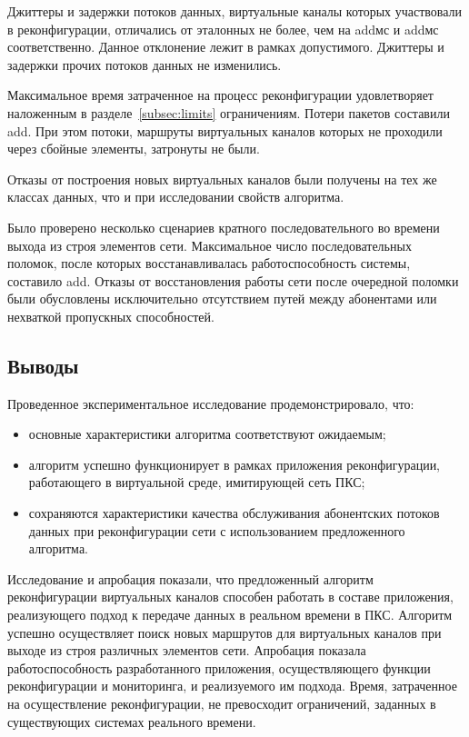 \documentclass[12pt, a4paper]{article}
\begin{document}
Джиттеры и задержки потоков данных, виртуальные каналы которых участвовали в реконфигурации, отличались от эталонных не более, чем на addмс и addмс соответственно. Данное отклонение лежит в рамках допустимого. Джиттеры и задержки прочих потоков данных не изменились.

Максимальное время затраченное на процесс реконфигурации удовлетворяет наложенным в разделе~\ref{subsec:limits} ограничениям. Потери пакетов составили add. При этом потоки, маршруты виртуальных каналов которых не проходили через сбойные элементы, затронуты не были.

Отказы от построения новых виртуальных каналов были получены на тех же классах данных, что и при исследовании свойств алгоритма.

Было проверено несколько сценариев кратного последовательного во времени выхода из строя элементов сети. Максимальное число последовательных поломок, после которых восстанавливалась работоспособность системы, составило add. Отказы от восстановления работы сети после очередной поломки были обусловлены исключительно отсутствием путей между абонентами или нехваткой пропускных способностей.

\subsection{Выводы}
Проведенное экспериментальное исследование продемонстрировало, что:
\begin{itemize}
	\item основные характеристики алгоритма соответствуют ожидаемым;
	\item алгоритм успешно функционирует в рамках приложения реконфигурации, работающего в виртуальной среде, имитирующей сеть ПКС;
	\item сохраняются характеристики качества обслуживания абонентских потоков данных при реконфигурации сети с использованием предложенного алгоритма.
\end{itemize}

Исследование и апробация показали, что предложенный алгоритм реконфигурации виртуальных каналов способен работать в составе приложения, реализующего подход к передаче данных в реальном времени в ПКС. Алгоритм успешно осуществляет поиск новых маршрутов для виртуальных каналов при выходе из строя различных элементов сети. Апробация показала работоспособность разработанного приложения, осуществляющего функции реконфигурации и мониторинга, и реализуемого им подхода. Время, затраченное на осуществление реконфигурации, не превосходит ограничений, заданных в существующих системах реального времени.
\end{document}
